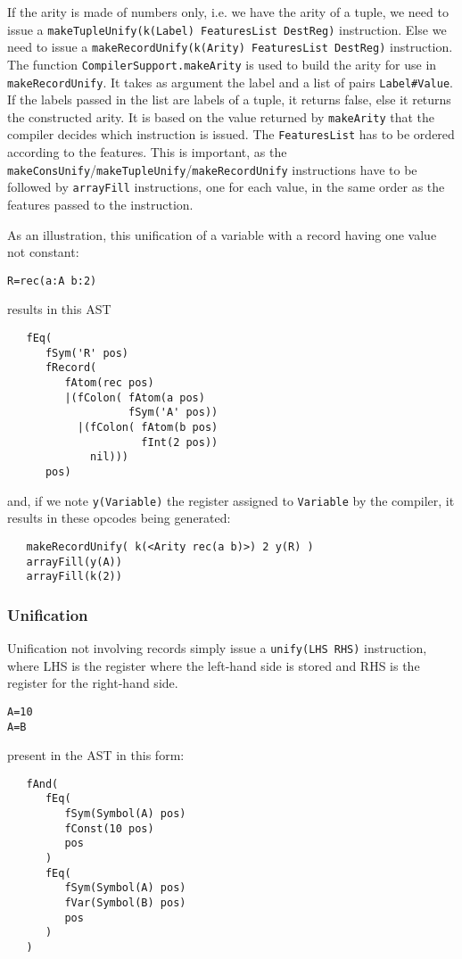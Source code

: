 \documentclass[a4paper]{memoir}
\begin{document}
If the arity is made of numbers only, i.e. we have the arity of a tuple, we need to issue a \lstinline!makeTupleUnify(k(Label) FeaturesList DestReg)! instruction. Else we need to issue a \lstinline!makeRecordUnify(k(Arity) FeaturesList DestReg)! instruction.
The function \lstinline!CompilerSupport.makeArity! is used to build the arity for use in \lstinline!makeRecordUnify!. It takes as argument the label and a list of pairs \lstinline!Label#Value!. If the labels passed in the list are labels of a tuple, it returns false, else it returns the constructed arity. It is based on the value returned by \lstinline!makeArity! that the compiler decides which instruction is issued.
The \lstinline!FeaturesList! has to be ordered according to the features. This is important, as the \lstinline!makeConsUnify!/\lstinline!makeTupleUnify!/\lstinline!makeRecordUnify! instructions have to be followed by \lstinline!arrayFill! instructions, one for each value, in the same order as the features passed to the instruction.

As an illustration, this unification of a variable with a record having one value not constant:
\begin{lstlisting}
R=rec(a:A b:2)
\end{lstlisting}
results in this AST
\begin{lstlisting}
   fEq(
      fSym('R' pos)
      fRecord(
         fAtom(rec pos)
         |(fColon( fAtom(a pos)
                   fSym('A' pos))
           |(fColon( fAtom(b pos)
                     fInt(2 pos))
             nil)))
      pos)
\end{lstlisting}
and, if we note \lstinline!y(Variable)! the register assigned to \lstinline!Variable! by the compiler, it results in these opcodes being generated:

\begin{lstlisting}
   makeRecordUnify( k(<Arity rec(a b)>) 2 y(R) )
   arrayFill(y(A))
   arrayFill(k(2)) 
\end{lstlisting}

\subsubsection{Unification}
Unification not involving records simply issue a \lstinline!unify(LHS RHS)! instruction, where LHS is the register where the left-hand side is stored and RHS is the register for the right-hand side.
\begin{lstlisting}
A=10
A=B
\end{lstlisting}
present in the AST in this form:
\begin{lstlisting}
   fAnd(
      fEq(
         fSym(Symbol(A) pos)
         fConst(10 pos)
         pos
      )
      fEq(
         fSym(Symbol(A) pos)
         fVar(Symbol(B) pos)
         pos
      )
   )
\end{lstlisting}
\end{document}
